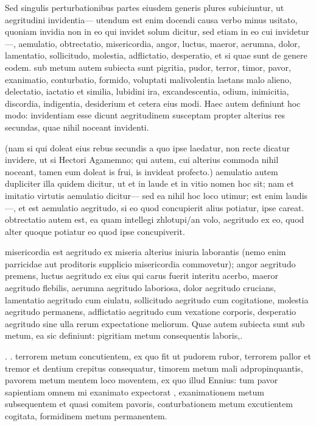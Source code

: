  Sed singulis perturbationibus partes eiusdem generis plures subiciuntur, ut aegritudini invidentia— utendum est enim docendi causa verbo minus usitato, quoniam invidia non in eo qui invidet solum dicitur, sed etiam in eo cui invidetur —, aemulatio, obtrectatio, misericordia, angor, luctus, maeror, aerumna, dolor, lamentatio, sollicitudo, molestia, adflictatio, desperatio, et si quae sunt de genere eodem. sub metum autem subiecta sunt pigritia, pudor, terror, timor, pavor, exanimatio, conturbatio, formido, voluptati malivolentia laetans malo alieno, delectatio, iactatio et similia, lubidini ira, excandescentia, odium, inimicitia, discordia, indigentia, desiderium et cetera eius modi. Haec autem definiunt hoc modo: invidentiam esse dicunt aegritudinem susceptam propter alterius res secundas, quae nihil noceant invidenti.

 (nam si qui doleat eius rebus secundis a quo ipse laedatur, non recte dicatur invidere, ut si Hectori Agamemno; qui autem, cui alterius commoda nihil noceant, tamen eum doleat is frui, is invideat profecto.) aemulatio autem dupliciter illa quidem dicitur, ut et in laude et in vitio nomen hoc sit; nam et imitatio virtutis aemulatio dicitur— sed ea nihil hoc loco utimur; est enim laudis—, et est aemulatio aegritudo, si eo quod concupierit alius potiatur, ipse careat. obtrectatio autem est, ea quam intellegi zhlotupi/an volo, aegritudo ex eo, quod alter quoque potiatur eo quod ipse concupiverit.

 misericordia est aegritudo ex miseria alterius iniuria laborantis (nemo enim parricidae aut proditoris supplicio misericordia commovetur); angor aegritudo premens, luctus aegritudo ex eius qui carus fuerit interitu acerbo, maeror aegritudo flebilis, aerumna aegritudo laboriosa, dolor aegritudo crucians, lamentatio aegritudo cum eiulatu, sollicitudo aegritudo cum cogitatione, molestia aegritudo permanens, adflictatio aegritudo cum vexatione corporis, desperatio aegritudo sine ulla rerum expectatione meliorum. Quae autem subiecta sunt sub metum, ea sic definiunt: pigritiam metum consequentis laboris,.

 . . terrorem metum concutientem, ex quo fit ut pudorem rubor, terrorem pallor et tremor et dentium crepitus consequatur, timorem metum mali adpropinquantis, pavorem metum mentem loco moventem, ex quo illud Ennius: tum pavor sapientiam omnem mi exanimato expectorat , exanimationem metum subsequentem et quasi comitem pavoris, conturbationem metum excutientem cogitata, formidinem metum permanentem.

